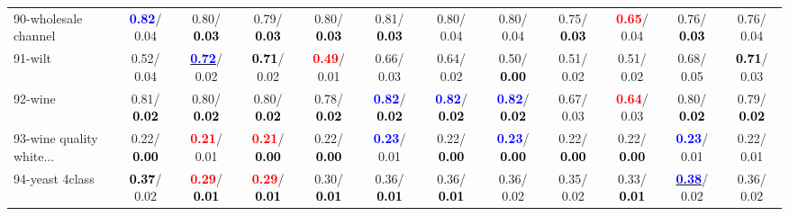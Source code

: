 \begin{table}[h]
\begin{center}
{\begin{tabular}{lc|c|c|c|c|c|c|c|c|c|c}
90-wholesale channel & \textcolor{blue}{\textbf{  0.82}}/  0.04 &   0.80/\textcolor{black}{\textbf{  0.03}} &   0.79/\textcolor{black}{\textbf{  0.03}} &   0.80/\textcolor{black}{\textbf{  0.03}} &   0.81/\textcolor{black}{\textbf{  0.03}} &   0.80/  0.04 &   0.80/  0.04 &   0.75/\textcolor{black}{\textbf{  0.03}} & \textcolor{red}{\textbf{  0.65}}/  0.04 &   0.76/\textcolor{black}{\textbf{  0.03}} &   0.76/  0.04 \\
91-wilt &   0.52/  0.04 & \underline{\textcolor{blue}{\textbf{  0.72}}}/  0.02 & \textcolor{black}{\textbf{  0.71}}/  0.02 & \textcolor{red}{\textbf{  0.49}}/  0.01 &   0.66/  0.03 &   0.64/  0.02 &   0.50/\textcolor{black}{\textbf{  0.00}} &   0.51/  0.02 &   0.51/  0.02 &   0.68/  0.05 & \textcolor{black}{\textbf{  0.71}}/  0.03 \\
92-wine &   0.81/\textcolor{black}{\textbf{  0.02}} &   0.80/\textcolor{black}{\textbf{  0.02}} &   0.80/\textcolor{black}{\textbf{  0.02}} &   0.78/\textcolor{black}{\textbf{  0.02}} & \textcolor{blue}{\textbf{  0.82}}/\textcolor{black}{\textbf{  0.02}} & \textcolor{blue}{\textbf{  0.82}}/\textcolor{black}{\textbf{  0.02}} & \textcolor{blue}{\textbf{  0.82}}/\textcolor{black}{\textbf{  0.02}} &   0.67/  0.03 & \textcolor{red}{\textbf{  0.64}}/  0.03 &   0.80/\textcolor{black}{\textbf{  0.02}} &   0.79/\textcolor{black}{\textbf{  0.02}} \\ \hline
93-wine quality white... &   0.22/\textcolor{black}{\textbf{  0.00}} & \textcolor{red}{\textbf{  0.21}}/  0.01 & \textcolor{red}{\textbf{  0.21}}/\textcolor{black}{\textbf{  0.00}} &   0.22/\textcolor{black}{\textbf{  0.00}} & \textcolor{blue}{\textbf{  0.23}}/  0.01 &   0.22/\textcolor{black}{\textbf{  0.00}} & \textcolor{blue}{\textbf{  0.23}}/\textcolor{black}{\textbf{  0.00}} &   0.22/\textcolor{black}{\textbf{  0.00}} &   0.22/\textcolor{black}{\textbf{  0.00}} & \textcolor{blue}{\textbf{  0.23}}/  0.01 &   0.22/  0.01 \\
94-yeast 4class & \textcolor{black}{\textbf{  0.37}}/  0.02 & \textcolor{red}{\textbf{  0.29}}/\textcolor{black}{\textbf{  0.01}} & \textcolor{red}{\textbf{  0.29}}/\textcolor{black}{\textbf{  0.01}} &   0.30/\textcolor{black}{\textbf{  0.01}} &   0.36/\textcolor{black}{\textbf{  0.01}} &   0.36/\textcolor{black}{\textbf{  0.01}} &   0.36/  0.02 &   0.35/  0.02 &   0.33/\textcolor{black}{\textbf{  0.01}} & \underline{\textcolor{blue}{\textbf{  0.38}}}/  0.02 &   0.36/  0.02 \\\end{tabular}
}\label{strats2bCIELM}
\end{center}
\end{table}
                                     